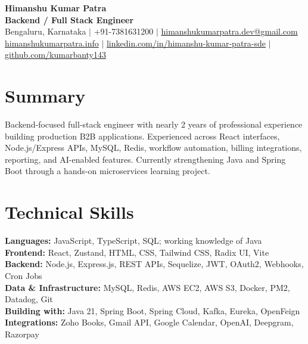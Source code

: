 \documentclass[a4paper,11pt]{article}
\begin{document}
\begin{center}
{\fontsize{23}{25}\selectfont\bfseries Himanshu Kumar Patra}\\[3pt]
{\large\bfseries Backend / Full Stack Engineer}\\[3pt]
\small Bengaluru, Karnataka $|$ +91-7381631200 $|$
\href{mailto:himanshukumarpatra.dev@gmail.com}{himanshukumarpatra.dev@gmail.com}\\
\href{https://himanshukumarpatra.info/}{himanshukumarpatra.info} $|$
\href{https://www.linkedin.com/in/himanshu-kumar-patra-sde/}{linkedin.com/in/himanshu-kumar-patra-sde} $|$
\href{https://github.com/kumarbanty143}{github.com/kumarbanty143}
\end{center}
\fontsize{10.5}{12.5}\selectfont

\section{Summary}
Backend-focused full-stack engineer with nearly 2 years of professional experience building production B2B applications. Experienced across React interfaces, Node.js/Express APIs, MySQL, Redis, workflow automation, billing integrations, reporting, and AI-enabled features. Currently strengthening Java and Spring Boot through a hands-on microservices learning project.

\section{Technical Skills}
\textbf{Languages:} JavaScript, TypeScript, SQL; working knowledge of Java\\
\textbf{Frontend:} React, Zustand, HTML, CSS, Tailwind CSS, Radix UI, Vite\\
\textbf{Backend:} Node.js, Express.js, REST APIs, Sequelize, JWT, OAuth2, Webhooks, Cron Jobs\\
\textbf{Data \& Infrastructure:} MySQL, Redis, AWS EC2, AWS S3, Docker, PM2, Datadog, Git\\
\textbf{Building with:} Java 21, Spring Boot, Spring Cloud, Kafka, Eureka, OpenFeign\\
\textbf{Integrations:} Zoho Books, Gmail API, Google Calendar, OpenAI, Deepgram, Razorpay
\end{document}
